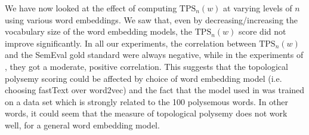 We have now looked at the effect of computing $\text{TPS}_n(w)$ at varying levels of $n$ using various word embeddings. We saw that, even by decreasing/increasing the vocabulary size of the word embedding models, the $\text{TPS}_n(w)$ score did not improve significantly. In all our experiments, the correlation between $\text{TPS}_n(w)$ and the SemEval gold standard were always negative, while in the experiments of \cite{jakubowski2020topology}, they got a moderate, positive correlation. This suggests that the topological polysemy scoring could be affected by choice of word embedding model (i.e. choosing fastText over word2vec) and the fact that the model used in \cite{jakubowski2020topology} was trained on a data set which is strongly related to the 100 polysemous words. In other words, it could seem that the measure of topological polysemy does not work well, for a general word embedding model.

